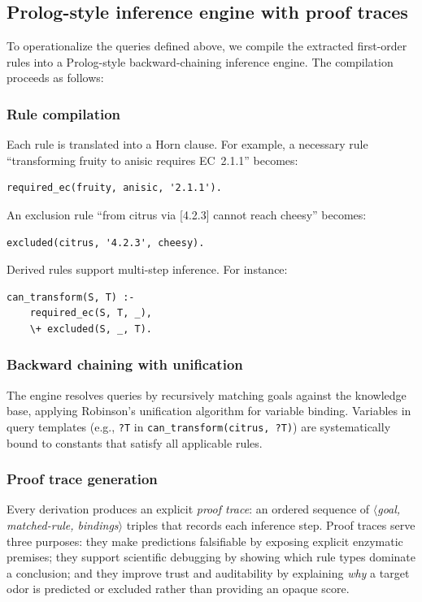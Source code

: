 \documentclass[a4paper,fleqn]{cas-sc}
\begin{document}
\subsection{Prolog-style inference engine with proof traces}\label{sec:prolog}

To operationalize the queries defined above, we compile the extracted first-order rules into a Prolog-style backward-chaining inference engine. The compilation proceeds as follows:

\subsubsection{Rule compilation}
Each rule is translated into a Horn clause. For example, a necessary rule ``transforming fruity to anisic requires EC~2.1.1'' becomes:
\begin{verbatim}
required_ec(fruity, anisic, '2.1.1').
\end{verbatim}
An exclusion rule ``from citrus via [4.2.3] cannot reach cheesy'' becomes:
\begin{verbatim}
excluded(citrus, '4.2.3', cheesy).
\end{verbatim}
Derived rules support multi-step inference. For instance:
\begin{verbatim}
can_transform(S, T) :-
    required_ec(S, T, _),
    \+ excluded(S, _, T).
\end{verbatim}

\subsubsection{Backward chaining with unification}
The engine resolves queries by recursively matching goals against the knowledge base, applying Robinson's unification algorithm for variable binding. Variables in query templates (e.g., \texttt{?T} in \texttt{can\_transform(citrus, ?T)}) are systematically bound to constants that satisfy all applicable rules.

\subsubsection{Proof trace generation}
Every derivation produces an explicit \emph{proof trace}: an ordered sequence of $\langle$\textit{goal, matched-rule, bindings}$\rangle$ triples that records each inference step. Proof traces serve three purposes: they make predictions falsifiable by exposing explicit enzymatic premises; they support scientific debugging by showing which rule types dominate a conclusion; and they improve trust and auditability by explaining \emph{why} a target odor is predicted or excluded rather than providing an opaque score.
\end{document}
